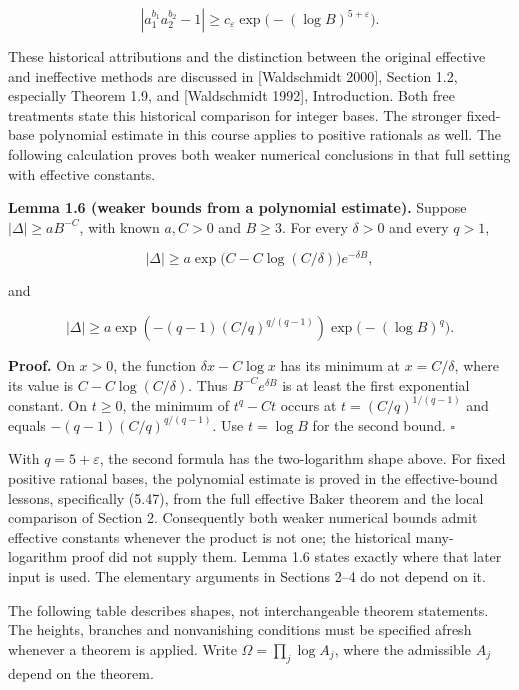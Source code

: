 \documentclass[
  11pt,
  a4paper,
]{article}
\begin{document}
\[
|a_1^{b_1}a_2^{b_2}-1|\ge c_\varepsilon
\exp\bigl(- (\log B)^{5+\varepsilon}\bigr).
\]

These historical attributions and the distinction between the original
effective and ineffective methods are discussed in {[}Waldschmidt
2000{]}, Section 1.2, especially Theorem 1.9, and {[}Waldschmidt
1992{]}, Introduction. Both free treatments state this historical
comparison for integer bases. The stronger fixed-base polynomial
estimate in this course applies to positive rationals as well. The
following calculation proves both weaker numerical conclusions in that
full setting with effective constants.

\textbf{Lemma 1.6 (weaker bounds from a polynomial estimate).} Suppose
\(|\Delta|\ge aB^{-C}\), with known \(a,C>0\) and \(B\ge3\). For every
\(\delta>0\) and every \(q>1\),

\[
|\Delta|\ge a\exp\bigl(C-C\log(C/\delta)\bigr)e^{-\delta B},
\]

and

\[
|\Delta|\ge a\exp\left(-(q-1)(C/q)^{q/(q-1)}\right)
\exp\bigl(- (\log B)^q\bigr).
\]

\textbf{Proof.} On \(x>0\), the function \(\delta x-C\log x\) has its
minimum at \(x=C/\delta\), where its value is \(C-C\log(C/\delta)\).
Thus \(B^{-C}e^{\delta B}\) is at least the first exponential constant.
On \(t\ge0\), the minimum of \(t^q-Ct\) occurs at \(t=(C/q)^{1/(q-1)}\)
and equals \(-(q-1)(C/q)^{q/(q-1)}\). Use \(t=\log B\) for the second
bound. \(\square\)

With \(q=5+\varepsilon\), the second formula has the two-logarithm shape
above. For fixed positive rational bases, the polynomial estimate is
proved in the effective-bound lessons, specifically (5.47), from the
full effective Baker theorem and the local comparison of Section 2.
Consequently both weaker numerical bounds admit effective constants
whenever the product is not one; the historical many-logarithm proof did
not supply them. Lemma 1.6 states exactly where that later input is
used. The elementary arguments in Sections 2--4 do not depend on it.

The following table describes shapes, not interchangeable theorem
statements. The heights, branches and nonvanishing conditions must be
specified afresh whenever a theorem is applied. Write
\(\Omega=\prod_j\log A_j\), where the admissible \(A_j\) depend on the
theorem.
\end{document}
